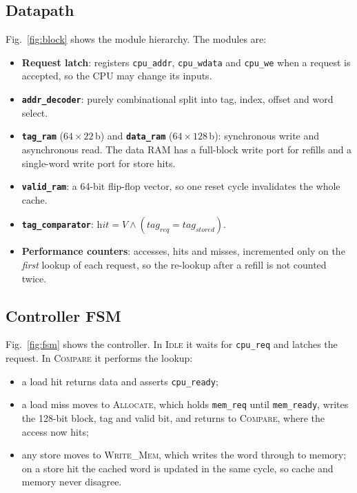 \documentclass[conference]{IEEEtran}
\begin{document}
\subsection{Datapath}
Fig.~\ref{fig:block} shows the module hierarchy. The modules are:
\begin{itemize}
  \item \textbf{Request latch}: registers \texttt{cpu\_addr}, \texttt{cpu\_wdata} and
        \texttt{cpu\_we} when a request is accepted, so the CPU may change its inputs.
  \item \textbf{\texttt{addr\_decoder}}: purely combinational split into tag, index, offset
        and word select.
  \item \textbf{\texttt{tag\_ram}} ($64\times22$\,b) and \textbf{\texttt{data\_ram}}
        ($64\times128$\,b): synchronous write and asynchronous read. The data RAM has a
        full-block write port for refills and a single-word write port for store hits.
  \item \textbf{\texttt{valid\_ram}}: a 64-bit flip-flop vector, so one reset cycle
        invalidates the whole cache.
  \item \textbf{\texttt{tag\_comparator}}: $\textit{hit} = V \land (\textit{tag}_{req} = \textit{tag}_{stored})$.
  \item \textbf{Performance counters}: accesses, hits and misses, incremented only on the
        \emph{first} lookup of each request, so the re-lookup after a refill is not counted
        twice.
\end{itemize}

\subsection{Controller FSM}
Fig.~\ref{fig:fsm} shows the controller. In \textsc{Idle} it waits for \texttt{cpu\_req}
and latches the request. In \textsc{Compare} it performs the lookup:
\begin{itemize}
  \item a load hit returns data and asserts \texttt{cpu\_ready};
  \item a load miss moves to \textsc{Allocate}, which holds \texttt{mem\_req} until
        \texttt{mem\_ready}, writes the 128-bit block, tag and valid bit, and returns to
        \textsc{Compare}, where the access now hits;
  \item any store moves to \textsc{Write\_Mem}, which writes the word through to memory; on
        a store hit the cached word is updated in the same cycle, so cache and memory never
        disagree.
\end{itemize}
\end{document}
